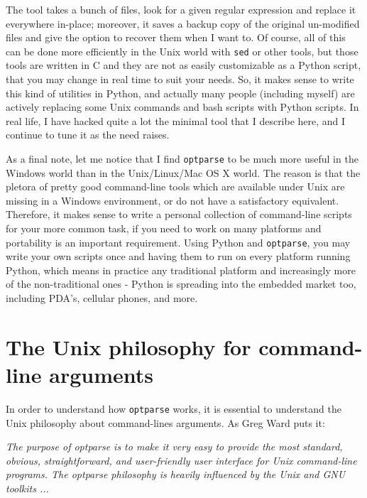 \documentclass[10pt,english]{article}
\begin{document}
The tool takes a bunch of files, look for a given regular expression 
and replace it everywhere in-place; moreover, it saves a backup copy of
the original un-modified files and give the option to recover 
them when I want to.  Of course, all of this can be done more efficiently 
in the Unix world with \texttt{sed} or other tools, but those tools are written 
in C and they are not as easily customizable as a Python script, that 
you may change in real time to suit your needs. So, it makes sense 
to write this kind of utilities in Python, and actually many people 
(including myself) are actively replacing some Unix commands and bash 
scripts with Python scripts. In real life, I have hacked quite a lot 
the minimal tool that I describe here, and I continue to tune it as the 
need raises.

As a final note, let me notice that I find \texttt{optparse} 
to be much more useful in the Windows world than in the Unix/Linux/Mac OS X
world. The reason is that the pletora 
of pretty good command-line tools which are available under Unix are 
missing in a Windows environment, or do not have a satisfactory 
equivalent. Therefore, 
it makes sense to write a personal collection of command-line scripts 
for your more common task, if you need to work on many platforms and
portability is an important requirement. 
Using Python and \texttt{optparse}, you may write your own scripts 
once and having them to run on every platform running Python, 
which means in practice any traditional platform and increasingly
more of the non-traditional ones - Python is spreading into the 
embedded market too, including PDA's, cellular phones, and more.



\hypertarget{the-unix-philosophy-for-command-line-arguments}{}
\section*{The Unix philosophy for command-line arguments}

In order to understand how \texttt{optparse} works, it is essential
to understand the Unix philosophy about command-lines arguments. 
As Greg Ward puts it:

\emph{The purpose of optparse is to make it very easy to provide the 
most standard, obvious, straightforward, and user-friendly user 
interface for Unix command-line programs. The optparse philosophy 
is heavily influenced by the Unix and GNU toolkits ...}
\end{document}
